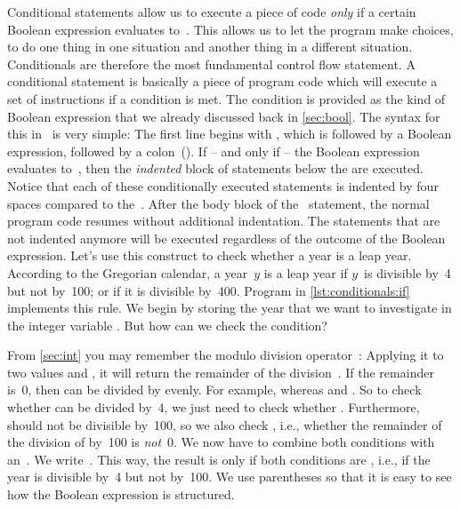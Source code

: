 %
%
Conditional statements allow us to execute a piece of code \emph{only} if a certain Boolean expression evaluates to~.
This allows us to let the program make choices, to do one thing in one situation and another thing in a different situation.
Conditionals are therefore the most fundamental control flow statement.%
%
%
%
A conditional statement is basically a piece of program code which will execute a set of instructions if a condition is met.
The condition is provided as the kind of Boolean expression that we already discussed back in \cref{sec:bool}.
The syntax for this in \python\ is very simple\cite{PSF:P3D:TPT:MCFT}:%
%
%
%
\FloatBarrier%
%
%
%
%
The first line begins with , which is followed by a Boolean expression, followed by a colon~(\pythonilIdx{:}).
If -- and only if -- the Boolean expression evaluates to~, then the \emph{indented} block of statements below the  are executed.
Notice that each of these conditionally executed statements is indented by four spaces compared to the~.
After the body block of the ~statement, the normal program code resumes without additional indentation.
The statements that are not indented anymore will be executed regardless of the outcome of the Boolean expression.%
%
%
%
Let's use this construct to check whether a year is a leap year.
According to the Gregorian calendar, a year~$y$ is a leap year if $y$~is divisible by~4 but not by~100; or if it is divisible by~400.
Program  in \cref{lst:conditionals:if} implements this rule.
We begin by storing the year that we want to investigate in the integer variable .
But how can we check the condition?

From \cref{sec:int} you may remember the modulo division operator~\pythonilIdx{\%}:
Applying it to two values  and , it will return the remainder of the division~\pythonIdx{//}.
If the remainder is~0, then  can be divided by  evenly.
For example,  whereas  and .
So to check whether  can be divided by~4, we just need to check whether .
Furthermore,  should not be divisible by~100, so we also check , i.e., whether the remainder of the division of  by~100 is \emph{not}~0.
We now have to combine both conditions with an~.
We write~.
This way, the result is only  if both conditions are , i.e., if the year is divisible by~4 but not by~100.
We use parentheses so that it is easy to see how the Boolean expression is structured.

